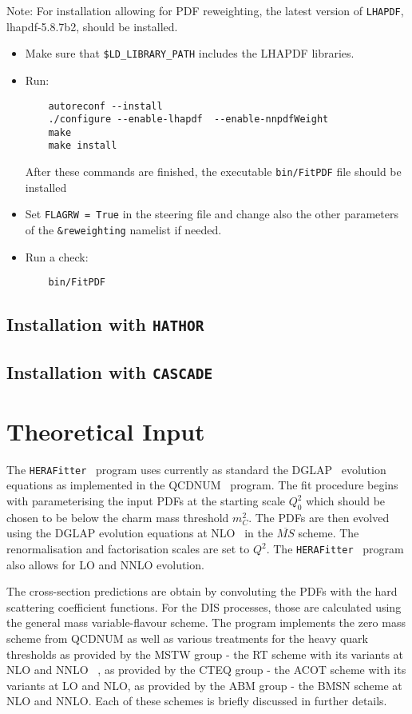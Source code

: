 \documentclass[11pt,a4paper]{article}
\newcommand\fitter{ \mbox{\tt HERAFitter} }
\begin{document}
Note: For installation allowing for PDF reweighting, the latest version of {\tt LHAPDF}, lhapdf-5.8.7b2, should be installed.

\begin{itemize}
\item Make sure that {\tt \$LD\_LIBRARY\_PATH} includes the LHAPDF libraries.
\item Run:
\begin{verbatim}
    autoreconf --install
    ./configure --enable-lhapdf  --enable-nnpdfWeight
    make 
    make install
\end{verbatim}
After these commands are finished, the executable {\tt bin/FitPDF} 
file should be installed
\item Set {\tt FLAGRW = True} in the steering file and change also the other parameters of the {\tt \&reweighting} namelist if needed.
\item  Run a check:
\begin{verbatim}
    bin/FitPDF 
\end{verbatim}
\end{itemize}


\subsection{Installation with {\tt HATHOR}}
\subsection{Installation with {\tt CASCADE}}

\section{Theoretical Input}
\label{sec:theory}
The \fitter\ program uses currently as standard the DGLAP~\cite{Gribov:1972ri,Gribov:1972rt,Lipatov:1974qm,Dokshitzer:1977sg,Altarelli:1977zs}
 evolution equations as implemented in the QCDNUM~\cite{qcdnum} program. The fit 
procedure begins with parameterising the input PDFs at the starting 
scale $Q^2_0$ which should be chosen to be below the charm mass threshold
$m_C^2$.
The PDFs are then evolved using the DGLAP evolution equations  
at NLO~\cite{Curci:1980uw,Furmanski:1980cm} in the $\overline{MS}$ scheme.
The renormalisation and factorisation scales are set to $Q^2$. The \fitter\ program
also allows for LO and NNLO evolution. 

The cross-section predictions are obtain by convoluting the PDFs with the 
hard scattering coefficient functions. For the DIS processes, those are calculated 
using the general mass variable-flavour scheme. 
The program implements the  zero mass scheme from QCDNUM as well as
various treatments for the heavy quark thresholds as provided by the MSTW group
- the RT scheme with its variants at NLO and NNLO ~\cite{Thorne:1997ga,Thorne:2006qt}, as provided by the CTEQ group - the ACOT scheme with its variants at LO and NLO, as provided by the ABM group - the BMSN scheme at NLO and NNLO.
Each of these schemes is briefly discussed in further details.
\end{document}
